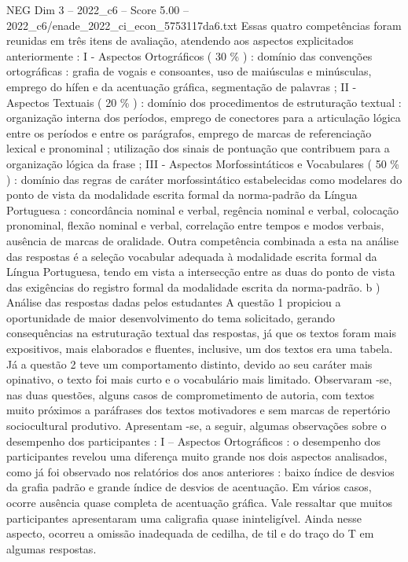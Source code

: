 \begin{textsample}{NEG Dim 3 – 2022\_c6 – Score 5.00 – 2022\_c6/enade\_2022\_ci\_econ\_5753117da6.txt}
Essas quatro competências foram reunidas em três itens de avaliação, atendendo aos aspectos explicitados anteriormente : I - Aspectos Ortográficos ( 30 \% ) : domínio das convenções ortográficas : grafia de vogais e consoantes, uso de maiúsculas e minúsculas, emprego do hífen e da acentuação gráfica, segmentação de palavras ; II - Aspectos Textuais ( 20 \% ) : domínio dos procedimentos de estruturação textual : organização interna dos períodos, emprego de conectores para a articulação lógica entre os períodos e entre os parágrafos, emprego de marcas de referenciação lexical e pronominal ; utilização dos sinais de pontuação que contribuem para a organização lógica da frase ; III - Aspectos Morfossintáticos e Vocabulares ( 50 \% ) : domínio das regras de caráter morfossintático estabelecidas como modelares do ponto de vista da modalidade escrita formal da norma-padrão da Língua Portuguesa : concordância nominal e verbal, regência nominal e verbal, colocação pronominal, flexão nominal e verbal, correlação entre tempos e modos verbais, ausência de marcas de oralidade.
Outra competência combinada a esta na análise das respostas é a seleção vocabular adequada à modalidade escrita formal da Língua Portuguesa, tendo em vista a intersecção entre as duas do ponto de vista das exigências do registro formal da modalidade escrita da norma-padrão. b ) Análise das respostas dadas pelos estudantes A questão 1 propiciou a oportunidade de maior desenvolvimento do tema solicitado, gerando consequências na estruturação textual das respostas, já que os textos foram mais expositivos, mais elaborados e fluentes, inclusive, um dos textos era uma tabela.
Já a questão 2 teve um comportamento distinto, devido ao seu caráter mais opinativo, o texto foi mais curto e o vocabulário mais limitado.
Observaram -se, nas duas questões, alguns casos de comprometimento de autoria, com textos muito próximos a paráfrases dos textos motivadores e sem marcas de repertório sociocultural produtivo.
Apresentam -se, a seguir, algumas observações sobre o desempenho dos participantes : I – Aspectos Ortográficos : o desempenho dos participantes revelou uma diferença muito grande nos dois aspectos analisados, como já foi observado nos relatórios dos anos anteriores : baixo índice de desvios da grafia padrão e grande índice de desvios de acentuação.
Em vários casos, ocorre ausência quase completa de acentuação gráfica.
Vale ressaltar que muitos participantes apresentaram uma caligrafia quase ininteligível.
Ainda nesse aspecto, ocorreu a omissão inadequada de cedilha, de til e do traço do T em algumas respostas.

\end{textsample}
